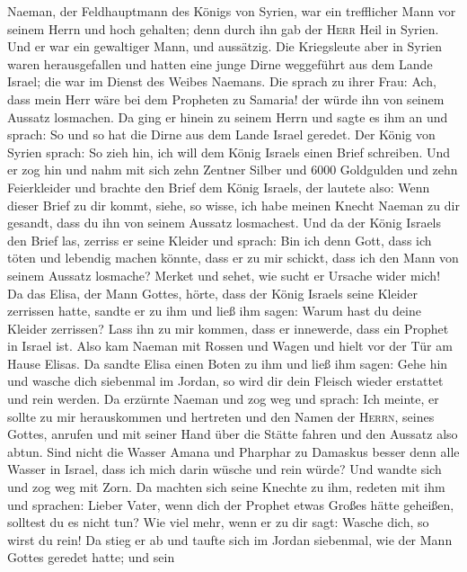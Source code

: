  Naeman, der Feldhauptmann des Königs von Syrien, war ein
trefflicher Mann vor seinem Herrn und hoch gehalten; denn durch ihn gab
der \textsc{Herr} Heil in Syrien. Und er war ein gewaltiger Mann, und
aussätzig.  Die Kriegsleute aber in Syrien waren
herausgefallen und hatten eine junge Dirne weggeführt aus dem Lande
Israel; die war im Dienst des Weibes Naemans.  Die sprach
zu ihrer Frau: Ach, dass mein Herr wäre bei dem Propheten zu Samaria!
der würde ihn von seinem Aussatz losmachen.  Da ging er
hinein zu seinem Herrn und sagte es ihm an und sprach: So und so hat die
Dirne aus dem Lande Israel geredet.  Der König von Syrien
sprach: So zieh hin, ich will dem König Israels einen Brief schreiben.
Und er zog hin und nahm mit sich zehn Zentner Silber und 6000 Goldgulden
und zehn Feierkleider  und brachte den Brief dem König
Israels, der lautete also: Wenn dieser Brief zu dir kommt, siehe, so
wisse, ich habe meinen Knecht Naeman zu dir gesandt, dass du ihn von
seinem Aussatz losmachest.  Und da der König Israels den
Brief las, zerriss er seine Kleider und sprach: Bin ich denn Gott, dass
ich töten und lebendig machen könnte, dass er zu mir schickt, dass ich
den Mann von seinem Aussatz losmache? Merket und sehet, wie sucht er
Ursache wider mich!  Da das Elisa, der Mann Gottes, hörte,
dass der König Israels seine Kleider zerrissen hatte, sandte er zu ihm
und ließ ihm sagen: Warum hast du deine Kleider zerrissen? Lass ihn zu
mir kommen, dass er innewerde, dass ein Prophet in Israel ist.
 Also kam Naeman mit Rossen und Wagen und hielt vor der
Tür am Hause Elisas.  Da sandte Elisa einen Boten zu ihm
und ließ ihm sagen: Gehe hin und wasche dich siebenmal im Jordan, so
wird dir dein Fleisch wieder erstattet und rein werden. 
Da erzürnte Naeman und zog weg und sprach: Ich meinte, er sollte zu mir
herauskommen und hertreten und den Namen der \textsc{Herrn}, seines
Gottes, anrufen und mit seiner Hand über die Stätte fahren und den
Aussatz also abtun.  Sind nicht die Wasser Amana und
Pharphar zu Damaskus besser denn alle Wasser in Israel, dass ich mich
darin wüsche und rein würde? Und wandte sich und zog weg mit Zorn.
 Da machten sich seine Knechte zu ihm, redeten mit ihm
und sprachen: Lieber Vater, wenn dich der Prophet etwas Großes hätte
geheißen, solltest du es nicht tun? Wie viel mehr, wenn er zu dir sagt:
Wasche dich, so wirst du rein!  Da stieg er ab und taufte
sich im Jordan siebenmal, wie der Mann Gottes geredet hatte; und sein
